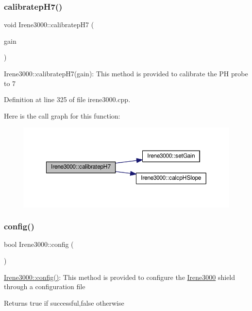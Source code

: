 \subsubsection{\texorpdfstring{calibratep\+H7()}{calibratepH7()}}
{\footnotesize\ttfamily void Irene3000\+::calibratep\+H7 (\begin{DoxyParamCaption}\item[{ads\+Gain\+\_\+t}]{gain }\end{DoxyParamCaption})}

Irene3000\+::calibratep\+H7(gain)\+: This method is provided to calibrate the PH probe to 7 

Definition at line 325 of file irene3000.\+cpp.

Here is the call graph for this function\+:
\nopagebreak
\begin{figure}[H]
\begin{center}
\leavevmode
\includegraphics[width=350pt]{d6/d03/class_irene3000_a2e810ddfa8b95eaa2446a408761c6bdc_cgraph}
\end{center}
\end{figure}
\mbox{\label{class_irene3000_afed5c35e4b23963c157847ef27c11e9c}} 
\subsubsection{\texorpdfstring{config()}{config()}}
{\footnotesize\ttfamily bool Irene3000\+::config (\begin{DoxyParamCaption}{ }\end{DoxyParamCaption})}

\hyperlink{class_irene3000_afed5c35e4b23963c157847ef27c11e9c}{Irene3000\+::config()}\+: This method is provided to configure the \hyperlink{class_irene3000}{Irene3000} shield through a configuration file

\begin{DoxyReturn}{Returns}
true if successful,false otherwise 
\end{DoxyReturn}


